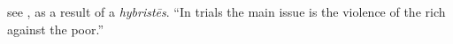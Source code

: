 \item[Violence of the rich against the poor,]

see , as a result of a \emph{hybristēs}. ``In trials the main issue is the violence of the rich against the poor.''
